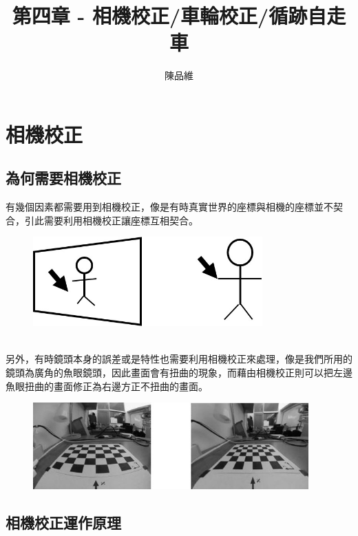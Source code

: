 \documentclass{article}
\title{第四章 - 相機校正/車輪校正/循跡自走車}
\author{陳品維}
\date{} %
\begin{document}
\maketitle

\section{相機校正}
\subsection{為何需要相機校正}

有幾個因素都需要用到相機校正，像是有時真實世界的座標與相機的座標並不契合，引此需要利用相機校正讓座標互相契合。
\\
\begin{figure}[htp]
    \begin{center}
        \includegraphics[width=250pt]{pic/圖片1.jpg}
    \end{center}
\end{figure}
\\
另外，有時鏡頭本身的誤差或是特性也需要利用相機校正來處理，像是我們所用的鏡頭為廣角的魚眼鏡頭，因此畫面會有扭曲的現象，而藉由相機校正則可以把左邊魚眼扭曲的畫面修正為右邊方正不扭曲的畫面。
\\
\begin{figure}[htp]
    \begin{center}
        \includegraphics[width=300pt]{pic/圖片2.jpg}
    \end{center}
\end{figure}

\subsection{相機校正運作原理}
\end{document}
